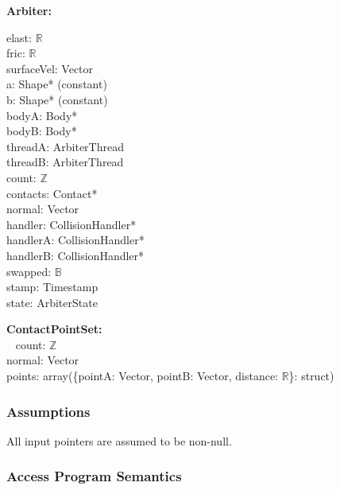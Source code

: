 \documentclass[12pt]{article}
\newcommand{\B}{$\mathbb{B}$}
\newcommand{\R}{$\mathbb{R}$}
\newcommand{\Z}{$\mathbb{Z}$}
\begin{document}
	\noindent \textbf{Arbiter:}
	\begin{multicols}{3}
		\noindent elast: \R \\
		fric: \R \\
		surfaceVel: Vector \\
		a: Shape* (constant) \\
		b: Shape* (constant) \\
		bodyA: Body* \\
		bodyB: Body* \\
		threadA: ArbiterThread \\
		threadB: ArbiterThread \\
		count: \Z \\
		contacts: Contact* \\
		normal: Vector \\
		handler: CollisionHandler* \\
		handlerA: CollisionHandler* \\
		handlerB: CollisionHandler* \\
		swapped: \B \\
		stamp: Timestamp \\
		state: ArbiterState
	\end{multicols}
	\noindent \textbf{ContactPointSet:} \\
	~\newline
		\noindent count: \Z \\
		normal: Vector \\
		points: array(\{pointA: Vector, pointB: Vector, distance: \R\}: struct)
		

\subsubsection{Assumptions} \label{SecAArbiter}
	All input pointers are assumed to be non-null.

\subsubsection{Access Program Semantics} \label{SecAPSArbiter}
\end{document}
